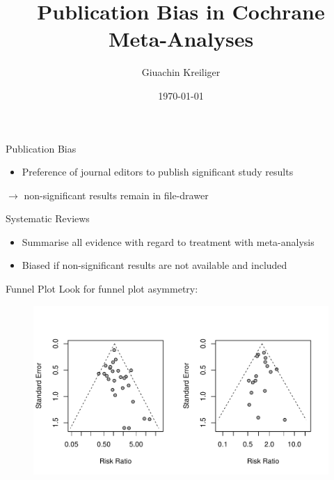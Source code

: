 \documentclass[english]{beamer}\usepackage[]{graphicx}\usepackage[]{color}
\title{Publication Bias in Cochrane Meta-Analyses}%
\author{Giuachin Kreiliger}
\date{\today}
\makeatletter
\def\maxwidth{ %
  \ifdim\Gin@nat@width>\linewidth
    \linewidth
  \else
    \Gin@nat@width
  \fi
}
\newenvironment{knitrout}{}{} %
\makeatother
\begin{document}
\maketitle


\begin{frame}{Publication Bias}
\begin{itemize}
\item Preference of journal editors to publish significant study results
\end{itemize}
\hspace{2mm} $\rightarrow$ \hspace{2mm} non-significant results remain in file-drawer
\end{frame}


\begin{frame}{Systematic Reviews}
\begin{itemize}
\item Summarise all evidence with regard to treatment with meta-analysis
\item Biased if non-significant results are not available and included
\end{itemize}
\end{frame}

\begin{frame}[fragile]{Funnel Plot}
Look for funnel plot asymmetry:

\vspace{-5mm}
\begin{figure}
\begin{knitrout}
\color{fgcolor}
\includegraphics[width=\maxwidth]{figure/unnamed-chunk-2-1} 

\end{knitrout}
\end{figure}

\end{frame}
\end{document}
